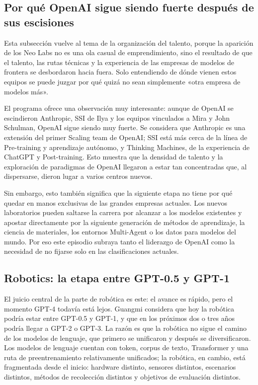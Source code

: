 \documentclass[a4paper]{article}
\begin{document}
\subsection{Por qué OpenAI sigue siendo fuerte después de sus escisiones}

Esta subsección vuelve al tema de la organización del talento, porque la aparición de los Neo Labs no es una ola casual de emprendimiento, sino el resultado de que el talento, las rutas técnicas y la experiencia de las empresas de modelos de frontera se desbordaron hacia fuera. Solo entendiendo de dónde vienen estos equipos se puede juzgar por qué quizá no sean simplemente «otra empresa de modelos más».

El programa ofrece una observación muy interesante: aunque de OpenAI se escindieron Anthropic, SSI de Ilya y los equipos vinculados a Mira y John Schulman, OpenAI sigue siendo muy fuerte. Se considera que Anthropic es una extensión del primer Scaling team de OpenAI; SSI está más cerca de la línea de Pre-training y aprendizaje autónomo, y Thinking Machines, de la experiencia de ChatGPT y Post-training. Esto muestra que la densidad de talento y la exploración de paradigmas de OpenAI llegaron a estar tan concentradas que, al dispersarse, dieron lugar a varios centros nuevos.

Sin embargo, esto también significa que la siguiente etapa no tiene por qué quedar en manos exclusivas de las grandes empresas actuales. Los nuevos laboratorios pueden saltarse la carrera por alcanzar a los modelos existentes y apostar directamente por la siguiente generación de métodos de aprendizaje, la ciencia de materiales, los entornos Multi-Agent o los datos para modelos del mundo. Por eso este episodio subraya tanto el liderazgo de OpenAI como la necesidad de no fijarse solo en las clasificaciones actuales.

\subsection{Robotics: la etapa entre GPT-0.5 y GPT-1}

El juicio central de la parte de robótica es este: el avance es rápido, pero el momento GPT-4 todavía está lejos. Guangmi considera que hoy la robótica podría estar entre GPT-0.5 y GPT-1, y que en los próximos dos o tres años podría llegar a GPT-2 o GPT-3. La razón es que la robótica no sigue el camino de los modelos de lenguaje, que primero se unificaron y después se diversificaron. Los modelos de lenguaje cuentan con token, corpus de texto, Transformer y una ruta de preentrenamiento relativamente unificados; la robótica, en cambio, está fragmentada desde el inicio: hardware distinto, sensores distintos, escenarios distintos, métodos de recolección distintos y objetivos de evaluación distintos.
\end{document}
